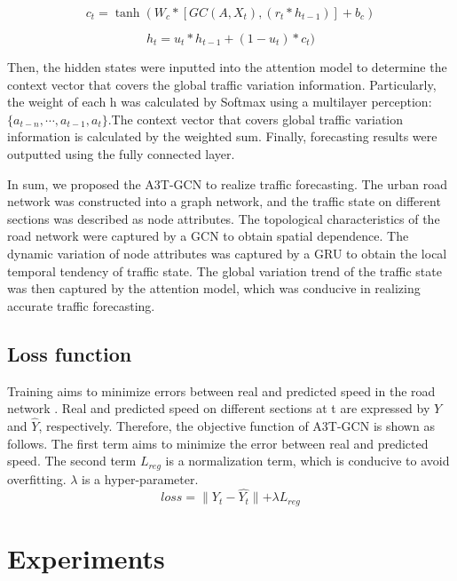\documentclass[10pt,journal,compsoc]{IEEEtran}
\begin{document}
\begin{equation}
c_{t} = \tanh (W_{c} \ast [GC(A,X_{t}),(r_{t} \ast h_{t-1})]+b_{c})
\end{equation}

\begin{equation}
h_{t} = u_{t} \ast h_{t-1}+(1-u_{t}) \ast c_{t})
\end{equation}
\par Then, the hidden states were inputted into the attention model to determine the context vector that covers the global traffic variation information. Particularly, the weight of each h was calculated by Softmax using a multilayer perception:$\{a_{t-n},\cdots,a_{t-1},a_t\}$.The context vector that covers global traffic variation information is calculated by the weighted sum. Finally, forecasting results were outputted using the fully connected layer. 
\par In sum, we proposed the A3T-GCN to realize traffic forecasting. The urban road network was constructed into a graph network, and the traffic state on different sections was described as node attributes. The topological characteristics of the road network were captured by a GCN to obtain spatial dependence. The dynamic variation of node attributes was captured by a GRU to obtain the local temporal tendency of traffic state. The global variation trend of the traffic state was then captured by the attention model, which was conducive in realizing accurate traffic forecasting.


\subsection{Loss function}
\par Training aims to minimize errors between real and predicted speed in the road network . Real and predicted speed on different sections at t are expressed by $Y$ and $\widehat{Y}$, respectively. Therefore, the objective function of A3T-GCN is shown as follows. The first term aims to minimize the error between real and predicted speed. The second term $L_{reg}$ is a normalization term, which is conducive to avoid overfitting. $\lambda$ is a hyper-parameter.
\begin{equation}
loss=\parallel Y_{t}-\widehat{Y_{t}}\parallel+\lambda L_{reg}
\end{equation}

\section{Experiments}
\end{document}
